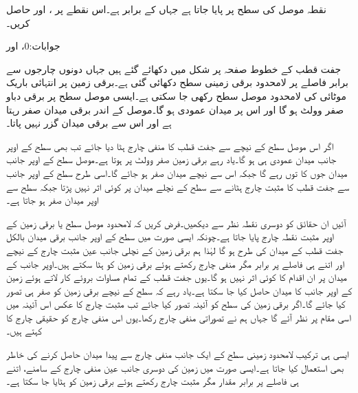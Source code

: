 نقطہ  موصل کی سطح پر پایا جاتا ہے جہاں  کے برابر ہے۔اس نقطے  پر ،  اور  حاصل کریں۔

جوابات:0،  اور 

جفت قطب کے خطوط صفحہ  پر  شکل  میں دکھائے گئے ہیں جہاں دونوں چارجوں سے برابر فاصلے پر لامحدود برقی زمینی سطح دکھائی گئی ہے۔برقی زمین پر انتہائی باریک موٹائی کی لامحدود موصل سطح رکھی جا سکتی ہے۔ایسی موصل سطح پر برقی دباو صفر وولٹ ہو گا اور اس پر میدان عمودی ہو گا۔موصل کے اندر برقی میدان صفر رہتا ہے اور اس سے برقی میدان گزر نہیں پاتا۔

اگر اس موصل سطح کے نیچے سے جفت قطب کا منفی چارج ہٹا دیا جائے تب بھی سطح کے اوپر جانب میدان عمودی ہی ہو گا۔یاد رہے برقی زمین صفر وولٹ پر ہوتا ہے۔موصل سطح کے اوپر جانب میدان جوں کا توں رہے گا جبکہ اس سے نیچے میدان صفر ہو جائے گا۔اسی طرح سطح کے اوپر جانب سے جفت قطب کا مثبت چارج ہٹانے سے سطح کے نچلے میدان پر کوئی اثر نہیں پڑتا جبکہ سطح سے اوپر میدان صفر ہو جاتا ہے۔

آئیں ان حقائق کو دوسری نقطہ نظر سے دیکھیں۔فرض کریں کہ لامحدود موصل سطح یا برقی زمین کے  اوپر مثبت نقطہ چارج پایا جاتا ہے۔چونکہ ایسی صورت میں سطح کے اوپر جانب برقی میدان بالکل جفت قطب کے میدان کی طرح ہو گا لہٰذا ہم برقی زمین کے نچلی جانب عین مثبت چارج کے نیچے اور اتنے ہی فاصلے پر برابر مگر منفی چارج رکھتے ہوئے برقی زمین کو ہٹا سکتے ہیں۔اوپر جانب کے میدان پر ان اقدام کا کوئی اثر نہیں ہو گا۔یوں جفت قطب کے تمام مساوات بروئے کار لاتے ہوئے زمین کے اوپر جانب کا میدان حاصل کیا جا سکتا ہے۔یاد رہے کہ سطح کے نیچے برقی زمین کو صفر ہی تصور کیا جائے گا۔اگر برقی زمین کی سطح کو آئینہ تصور کیا جائے تب مثبت چارج کا عکس اس آئینہ میں اسی مقام پر نظر آئے گا جہاں ہم نے تصوراتی منفی چارج رکھا۔یوں اس منفی چارج کو حقیقی چارج کا  کہتے ہیں۔

ایسی ہی ترکیب لامحدود زمینی سطح کے ایک جانب منفی چارج سے پیدا میدان حاصل کرنے کی خاطر بھی استعمال کیا جاتا ہے۔ایسی صورت میں زمین کی دوسری جانب عین منفی چارج کے سامنے،  اتنے ہی فاصلے پر برابر مقدار مگر مثبت چارج رکھتے ہوئے برقی زمین کو ہٹایا جا سکتا ہے۔

